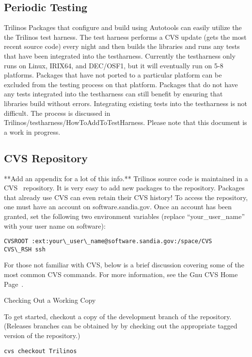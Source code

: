 \documentclass[12pt,relax]{SANDreport}
\begin{document}
	\subsection{Periodic Testing}
Trilinos Packages that configure and build using Autotools can easily 
utilize the the Trilinos test harness.  The test harness performs a CVS update
(gets the most recent source code) every night and then builds the libraries
and runs any tests that have been integrated into the testharness.  
Currently the testharness only runs on Linux, IRIX64, and DEC/OSF1, but it 
will eventually run on 5-8 platforms.  Packages that have not ported to a 
particular platform can be excluded from the testing process on that 
platform.  Packages that do not have any tests integrated into the 
testharness can still benefit by ensuring that libraries build without 
errors.  Integrating existing tests into the testharness is not difficult.  
The process is discussed in Trilinos/testharness/HowToAddToTestHarness.  
Please note that this document is a work in progress.

\subsection{CVS Repository}
**Add an appendix for a lot of this info.**
Trilinos source code is maintained in a CVS~\cite{CVS} repository.  It is 
very easy to add new packages to the repository.  Packages that already use 
CVS can even retain their CVS history!  To access the repository, one must 
have an account on software.sandia.gov.  Once an account has been granted, 
set the following two environment variables (replace ``your\_user\_name'' 
with your user name on software):

\begin{verbatim}
CVSROOT :ext:your\_user\_name@software.sandia.gov:/space/CVS
CVS\_RSH ssh
\end{verbatim}

For those not familiar with CVS, below is a brief discussion covering some 
of the most common CVS commands.  For more information, see the Gnu CVS Home
Page~\cite{CVS}.

Checking Out a Working Copy

To get started, checkout a copy of the development branch of the repository.
(Releases branches can be obtained by by checking out the appropriate 
tagged version of the repository.)

\begin{verbatim}
cvs checkout Trilinos
\end{verbatim}
\end{document}
